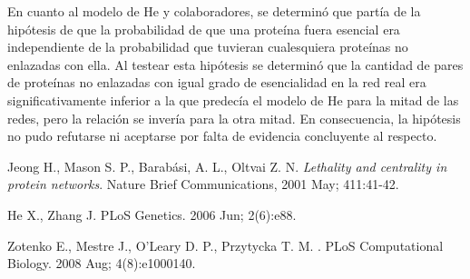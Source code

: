 \documentclass[%
 reprint,
 amsmath,amssymb,
 aps,
]{revtex4-1}
\begin{document}
En cuanto al modelo de He y colaboradores, se determin\'o que part\'ia de la hip\'otesis de que la probabilidad de que una prote\'ina fuera esencial era independiente de la probabilidad que tuvieran cualesquiera prote\'inas no enlazadas con ella. Al testear esta hip\'otesis se determin\'o que la cantidad de pares de prote\'inas no enlazadas con igual grado de esencialidad en la red real era significativamente inferior a la que predec\'ia el modelo de He para la mitad de las redes, pero la relaci\'on se inver\'ia para la otra mitad. En consecuencia, la hip\'otesis no pudo refutarse ni aceptarse por falta de evidencia concluyente al respecto.



\begin{thebibliography}{10}

Jeong H., Mason S. P., Barabási, A. L., Oltvai Z. N. {\em Lethality and centrality in protein networks}. Nature Brief Communications, 2001 May; 411:41-42.

He X., Zhang J.
 PLoS Genetics. 2006 Jun; 2(6):e88.

Zotenko E., Mestre J., O'Leary D. P., Przytycka T. M.
.
\newblock PLoS Computational Biology. 2008 Aug; 4(8):e1000140.

\end{thebibliography}
\end{document}
